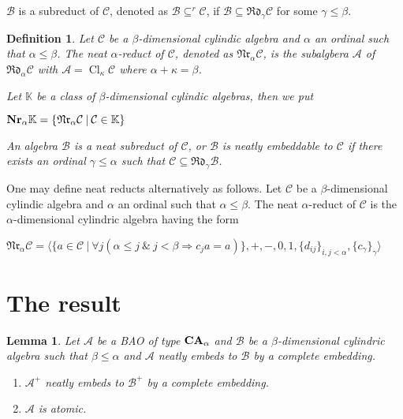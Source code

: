\documentclass[a4paper]{article}
\theoremstyle{defin}
\newtheorem{defin}{Definition}
\theoremstyle{theorem}
\theoremstyle{prop}
\theoremstyle{lemma}
\newtheorem{lemma}{Lemma}
\theoremstyle{fact}
\theoremstyle{ex}
\theoremstyle{col}
\begin{document}
$\mathcal{B}$ is a subreduct of $\mathcal{C}$, denoted as $\mathcal{B} \subseteq^{r} \mathcal{C}$, if $\mathcal{B} \subseteq \mathfrak{R}\mathfrak{d}_{\gamma}\mathcal{C}$ for some $\gamma \leq \beta$.

\begin{defin}
  Let $\mathcal{C}$ be a $\beta$-dimensional cylindic algebra and $\alpha$ an ordinal such that $\alpha \leq \beta$.
  The neat $\alpha$-reduct of $\mathcal{C}$, denoted as $\mathfrak{N}\mathfrak{r}_\alpha \mathcal{C}$,
  is the subalgbera $\mathcal{A}$ of $\mathfrak{R}\mathfrak{d}_{\alpha}\mathcal{C}$ with $\mathcal{A} = \operatorname{Cl}_{\kappa} \mathcal{C}$ where $\alpha + \kappa = \beta$.

  Let $\mathbb{K}$ be a class of $\beta$-dimensional cylindic algebras, then we put
  \begin{center}
    ${\bf Nr}_{\alpha}\mathbb{K} = \{ \mathfrak{N}\mathfrak{r}_\alpha \mathcal{C} \: | \: \mathcal{C} \in \mathbb{K} \}$
  \end{center}

  An algebra $\mathcal{B}$ is a neat subreduct of $\mathcal{C}$, or $\mathcal{B}$ is neatly embeddable to $\mathcal{C}$ if there exists an ordinal $\gamma \leq \alpha$ such that
  $\mathcal{C} \subseteq \mathfrak{R}\mathfrak{d}_{\gamma}\mathcal{B}$.
\end{defin}

One may define neat reducts alternatively as follows.
Let $\mathcal{C}$ be a $\beta$-dimensional cylindic algebra and $\alpha$ an ordinal such that $\alpha \leq \beta$. The neat $\alpha$-reduct of $\mathcal{C}$ is the $\alpha$-dimensional cylindric algebra having the form

\begin{center}
  $\mathfrak{N}\mathfrak{r}_\alpha \mathcal{C} = \langle \{ a \in \mathcal{C} \: | \: \forall j (\alpha \leq j \: \& \: j < \beta \Rightarrow c_j a = a) \}, +, -, 0, 1, \{d_{ij}\}_{i,j < \alpha}, \{c_{\gamma}\}_{\gamma} \rangle$
\end{center}

\section{The result}

\begin{lemma}\label{Neat}
  Let $\mathcal{A}$ be a BAO of type ${\bf CA}_{\alpha}$ and $\mathcal{B}$ be a $\beta$-dimensional cylindric algebra such that $\beta \leq \alpha$ and $\mathcal{A}$ neatly embeds to $\mathcal{B}$ by a complete embedding.

  \begin{enumerate}
  \item $\mathcal{A}^{+}$ neatly embeds to $\mathcal{B}^{+}$ by a complete embedding.
  \item $\mathcal{A}$ is atomic.
  \end{enumerate}
\end{lemma}
\end{document}
